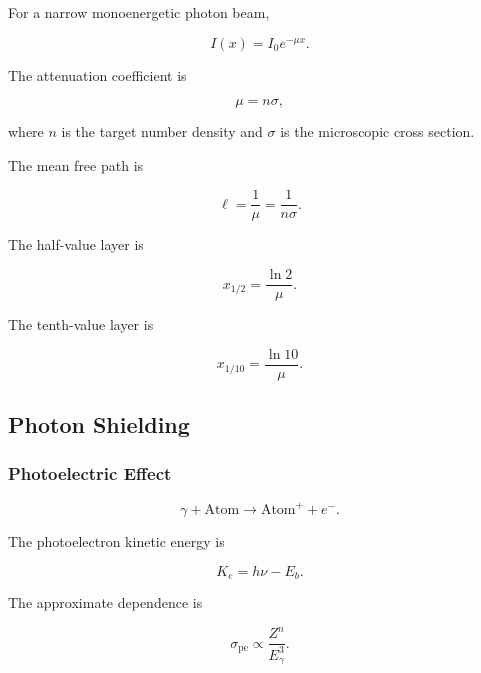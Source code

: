 \documentclass[12pt]{article}
\begin{document}
For a narrow monoenergetic photon beam,

\begin{equation}
\boxed{I(x)=I_0e^{-\mu x}}.
\end{equation}

The attenuation coefficient is

\begin{equation}
\mu=n\sigma,
\end{equation}

where $n$ is the target number density and $\sigma$ is the microscopic cross section.

The mean free path is

\begin{equation}
\boxed{\ell=\frac{1}{\mu}=\frac{1}{n\sigma}}.
\end{equation}

The half-value layer is

\begin{equation}
\boxed{x_{1/2}=\frac{\ln 2}{\mu}}.
\end{equation}

The tenth-value layer is

\begin{equation}
\boxed{x_{1/10}=\frac{\ln 10}{\mu}}.
\end{equation}

\subsection{Photon Shielding}

\subsubsection{Photoelectric Effect}

\begin{equation}
\gamma+\mathrm{Atom}
\rightarrow
\mathrm{Atom}^+
+
e^-.
\end{equation}

The photoelectron kinetic energy is

\begin{equation}
\boxed{K_e=h\nu-E_b}.
\end{equation}

The approximate dependence is

\begin{equation}
\sigma_{\mathrm{pe}}\propto\frac{Z^n}{E_\gamma^3}.
\end{equation}
\end{document}
